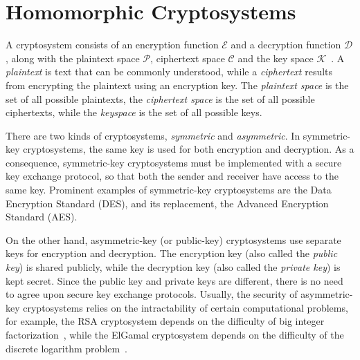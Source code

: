 \section{Homomorphic Cryptosystems}

A cryptosystem consists of an encryption function $\mathcal{E}$ and a decryption function $\mathcal{D}$, along with the plaintext space $\mathcal{P}$, ciphertext space $\mathcal{C}$ and the key space $\mathcal{K}$~\cite{bauer_cryptosystem_2005}. A \textit{plaintext} is text that can be commonly understood, while a \textit{ciphertext} results from encrypting the plaintext using an encryption key. The \textit{plaintext space} is the set of all possible plaintexts, the \textit{ciphertext space} is the set of all possible ciphertexts, while the \textit{keyspace} is the set of all possible keys.

There are two kinds of cryptosystems, \textit{symmetric} and \textit{asymmetric}. In symmetric-key cryptosystems, the same key is used for both encryption and decryption. As a consequence, symmetric-key cryptosystems must be implemented with a secure key exchange protocol, so that both the sender and receiver have access to the same key. Prominent examples of symmetric-key cryptosystems are the Data Encryption Standard (DES), and its replacement, the Advanced Encryption Standard (AES).

On the other hand, asymmetric-key (or public-key) cryptosystems use separate keys for encryption and decryption. The encryption key (also called the \textit{public key}) is shared publicly, while the decryption key (also called the \textit{private key}) is kept secret. Since the public key and private keys are different, there is no need to agree upon secure key exchange protocols. Usually, the security of asymmetric-key cryptosystems relies on the intractability of certain computational problems, for example, the RSA cryptosystem depends on the difficulty of big integer factorization~\cite{rivest_method_1978}, while the ElGamal cryptosystem depends on the difficulty of the discrete logarithm problem~\cite{blakley_public_1985}.

